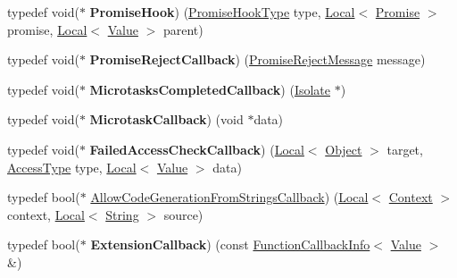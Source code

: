 \begin{DoxyCompactItemize}
typedef void($\ast$ {\bfseries Promise\+Hook}) (\mbox{\hyperlink{namespacev8_afe9d9e16c02074ac8482a8f09e19d5cc}{Promise\+Hook\+Type}} type, \mbox{\hyperlink{classv8_1_1Local}{Local}}$<$ \mbox{\hyperlink{classv8_1_1Promise}{Promise}} $>$ promise, \mbox{\hyperlink{classv8_1_1Local}{Local}}$<$ \mbox{\hyperlink{classv8_1_1Value}{Value}} $>$ parent)
\item 
\mbox{\label{namespacev8_a3367f6ae375d6d4b4b3f992953c135ba}} 
typedef void($\ast$ {\bfseries Promise\+Reject\+Callback}) (\mbox{\hyperlink{classv8_1_1PromiseRejectMessage}{Promise\+Reject\+Message}} message)
\item 
\mbox{\label{namespacev8_af193f756612950a896e140052cf17a42}} 
typedef void($\ast$ {\bfseries Microtasks\+Completed\+Callback}) (\mbox{\hyperlink{classv8_1_1Isolate}{Isolate}} $\ast$)
\item 
\mbox{\label{namespacev8_a64445c32058729cdc44d56ff13458bed}} 
typedef void($\ast$ {\bfseries Microtask\+Callback}) (void $\ast$data)
\item 
\mbox{\label{namespacev8_a1352a0d6e487b7092ea79e2d3d4ecd12}} 
typedef void($\ast$ {\bfseries Failed\+Access\+Check\+Callback}) (\mbox{\hyperlink{classv8_1_1Local}{Local}}$<$ \mbox{\hyperlink{classv8_1_1Object}{Object}} $>$ target, \mbox{\hyperlink{namespacev8_add8bef6469c5b94706584124e610046c}{Access\+Type}} type, \mbox{\hyperlink{classv8_1_1Local}{Local}}$<$ \mbox{\hyperlink{classv8_1_1Value}{Value}} $>$ data)
\item 
typedef bool($\ast$ \mbox{\hyperlink{namespacev8_ab2c5378d97ebe2885b300fe0bcd3f89c}{Allow\+Code\+Generation\+From\+Strings\+Callback}}) (\mbox{\hyperlink{classv8_1_1Local}{Local}}$<$ \mbox{\hyperlink{classv8_1_1Context}{Context}} $>$ context, \mbox{\hyperlink{classv8_1_1Local}{Local}}$<$ \mbox{\hyperlink{classv8_1_1String}{String}} $>$ source)
\item 
\mbox{\label{namespacev8_aa2658de2b2db3011b6d7ca633683e384}} 
typedef bool($\ast$ {\bfseries Extension\+Callback}) (const \mbox{\hyperlink{classv8_1_1FunctionCallbackInfo}{Function\+Callback\+Info}}$<$ \mbox{\hyperlink{classv8_1_1Value}{Value}} $>$ \&)
\item 
\mbox{\label{namespacev8_ae3e81e7628a27d5186cada12bb79a140}} 

\end{DoxyCompactItemize}
